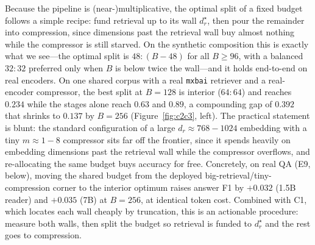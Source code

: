 \documentclass{article}
\newcommand{\dr}{d_r}
\begin{document}
Because the pipeline is (near-)multiplicative, the optimal split of a fixed budget follows a simple
recipe: fund retrieval up to its wall $\dr^\star$, then pour the remainder into compression, since
dimensions past the retrieval wall buy almost nothing while the compressor is still starved. On the
synthetic composition this is exactly what we see---the optimal split is $48{:}(B\!-\!48)$ for all
$B\ge 96$, with a balanced $32{:}32$ preferred only when $B$ is below twice the wall---and it holds
end-to-end on real encoders. On one shared corpus with a real \texttt{mxbai} retriever and a
real-encoder compressor, the best split at $B=128$ is interior ($64{:}64$) and reaches $0.234$ while
the stages alone reach $0.63$ and $0.89$, a compounding gap of $0.392$ that shrinks to $0.137$ by
$B=256$ (Figure~\ref{fig:c2c3}, left). The practical statement is blunt: the standard configuration
of a large $\dr\!\approx\!768\!-\!1024$ embedding with a tiny $m\!\approx\!1\!-\!8$ compressor sits
far off the frontier, since it spends heavily on embedding dimensions past the retrieval wall while
the compressor overflows, and re-allocating the same budget buys accuracy for free. Concretely, on
real QA (E9, below), moving the shared budget from the deployed big-retrieval/tiny-compression
corner to the interior optimum raises answer F1 by $+0.032$ (1.5B reader) and $+0.035$ (7B) at
$B{=}256$, at identical token cost. Combined with C1,
which locates each wall cheaply by truncation, this is an actionable procedure: measure both walls,
then split the budget so retrieval is funded to $\dr^\star$ and the rest goes to compression.
\end{document}
